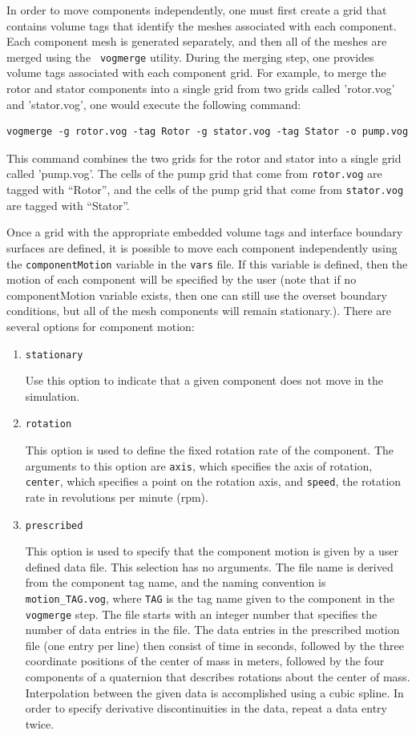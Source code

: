 \documentclass{article}
\begin{document}
In order to move components independently, one must first create a grid
that contains volume tags that identify the meshes associated with
each component.  Each component mesh is generated
separately, and then all of the meshes are merged using the {\tt
  vogmerge} utility.  During the merging step, one provides
volume tags associated with each component grid.  For example, to merge the
rotor and stator components into a single grid from two grids called
'rotor.vog' and 'stator.vog', one would execute the following command:
\begin{verbatim}
vogmerge -g rotor.vog -tag Rotor -g stator.vog -tag Stator -o pump.vog
\end{verbatim}
This command combines the two grids for the rotor and stator into a
single grid called 'pump.vog'.  The cells of the pump grid that come from
{\tt rotor.vog} are tagged with ``Rotor'', and the cells of the pump grid
that come from {\tt stator.vog} are tagged with ``Stator''. 

Once a grid with the appropriate embedded volume tags and interface
boundary surfaces are defined, it is possible to move each component
independently using the {\tt componentMotion} variable in the {\tt vars}
file.  If this variable is defined, then the motion of each component will be specified by the user (note that if no componentMotion variable exists, then one can still use the overset boundary conditions, but all of the mesh components will remain stationary.).  There are several options for component motion:
\begin{enumerate}
\item {\tt stationary} 

Use this option to indicate that a given component does not move in
the simulation.
\item {\tt rotation}

This option is used to define the fixed rotation rate of the component.
The arguments to this option are {\tt axis},
which specifies the axis of rotation, {\tt center}, which specifies a
point on the rotation axis, and {\tt speed}, the rotation rate in
revolutions per minute (rpm).

\item {\tt prescribed}

This option is used to specify that the component motion is
given by a user defined data file.  This selection has no
arguments.  The file name is derived from the component tag name,
and the naming convention is {\tt motion\_TAG.vog}, where {\tt TAG} is
the tag name given to the component in the {\tt
  vogmerge} step.  The file starts with an integer number that specifies
the number of data entries in the file.
The data entries in the prescribed motion file (one entry per line) then
consist of time in seconds, followed by the three coordinate
positions of the center of mass in meters, followed by the four
components of a quaternion that describes rotations about the center
of mass.  Interpolation between the given data is accomplished using a cubic
spline.  In order to specify derivative discontinuities in the data,
repeat a data entry twice.

\end{enumerate}
\end{document}
